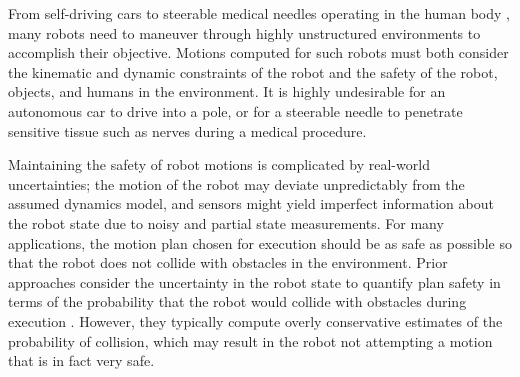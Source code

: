 
From self-driving cars \cite{Thrun10_CACM} to steerable medical needles operating in the human body \cite{Cowan2011_Chapter}, many robots need to maneuver through highly unstructured environments to accomplish their objective. Motions computed for such robots must both consider the kinematic and dynamic constraints of the robot and the safety of the robot, objects, and humans in the environment. It is highly undesirable for an autonomous car to drive into a pole, or for a steerable needle to penetrate sensitive tissue such as nerves during a medical procedure.

Maintaining the safety of robot motions is complicated by real-world uncertainties; the motion of the robot may deviate unpredictably from the assumed dynamics model, and  sensors might yield imperfect information about the robot state due to noisy and partial state measurements. For many applications, the motion plan chosen for execution should be as safe as possible so that the robot does not collide with obstacles in the environment. Prior approaches consider the uncertainty in the robot state to quantify plan safety in terms of the probability that the robot would collide with obstacles during execution \cite{vandenBerg11_IJRR, Vitus11_ICRA, Bry11_ICRA}. However, they typically compute overly conservative estimates of the probability of collision, which may result in the robot not attempting a motion that is in fact very safe.

